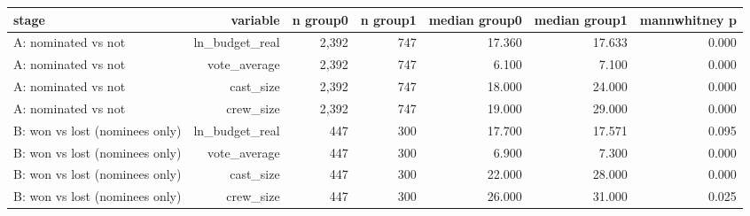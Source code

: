 \begin{tabular}{lrrrrrr}
\toprule
stage & variable & n group0 & n group1 & median group0 & median group1 & mannwhitney p \\
\midrule
A: nominated vs not & ln\_budget\_real & 2,392 & 747 & 17.360 & 17.633 & 0.000 \\
A: nominated vs not & vote\_average & 2,392 & 747 & 6.100 & 7.100 & 0.000 \\
A: nominated vs not & cast\_size & 2,392 & 747 & 18.000 & 24.000 & 0.000 \\
A: nominated vs not & crew\_size & 2,392 & 747 & 19.000 & 29.000 & 0.000 \\
B: won vs lost (nominees only) & ln\_budget\_real & 447 & 300 & 17.700 & 17.571 & 0.095 \\
B: won vs lost (nominees only) & vote\_average & 447 & 300 & 6.900 & 7.300 & 0.000 \\
B: won vs lost (nominees only) & cast\_size & 447 & 300 & 22.000 & 28.000 & 0.000 \\
B: won vs lost (nominees only) & crew\_size & 447 & 300 & 26.000 & 31.000 & 0.025 \\
\bottomrule
\end{tabular}